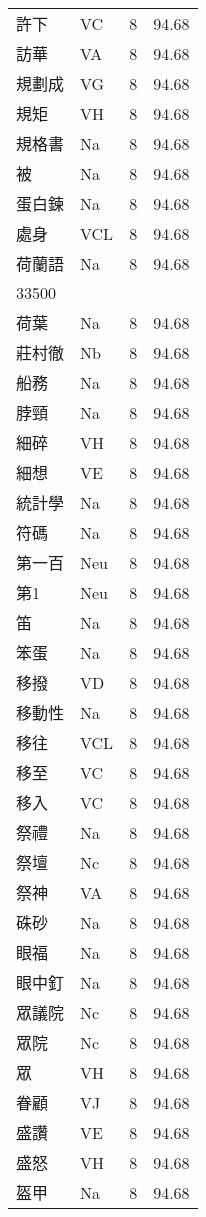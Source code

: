 \documentclass[twocolumn]{book}
\begin{document}
\begin{supertabular}{llrr}
許下 & VC & 8 &  94.68\\
訪華 & VA & 8 &  94.68\\
規劃成 & VG & 8 &  94.68\\
規矩 & VH & 8 &  94.68\\
規格書 & Na & 8 &  94.68\\
被 & Na & 8 &  94.68\\
蛋白鍊 & Na & 8 &  94.68\\
處身 & VCL & 8 &  94.68\\
荷蘭語 & Na & 8 &  94.68\\
33500\\
荷葉 & Na & 8 &  94.68\\
莊村徹 & Nb & 8 &  94.68\\
船務 & Na & 8 &  94.68\\
脖頸 & Na & 8 &  94.68\\
細碎 & VH & 8 &  94.68\\
細想 & VE & 8 &  94.68\\
統計學 & Na & 8 &  94.68\\
符碼 & Na & 8 &  94.68\\
第一百 & Neu & 8 &  94.68\\
第1 & Neu & 8 &  94.68\\
笛 & Na & 8 &  94.68\\
笨蛋 & Na & 8 &  94.68\\
移撥 & VD & 8 &  94.68\\
移動性 & Na & 8 &  94.68\\
移往 & VCL & 8 &  94.68\\
移至 & VC & 8 &  94.68\\
移入 & VC & 8 &  94.68\\
祭禮 & Na & 8 &  94.68\\
祭壇 & Nc & 8 &  94.68\\
祭神 & VA & 8 &  94.68\\
硃砂 & Na & 8 &  94.68\\
眼福 & Na & 8 &  94.68\\
眼中釘 & Na & 8 &  94.68\\
眾議院 & Nc & 8 &  94.68\\
眾院 & Nc & 8 &  94.68\\
眾 & VH & 8 &  94.68\\
眷顧 & VJ & 8 &  94.68\\
盛讚 & VE & 8 &  94.68\\
盛怒 & VH & 8 &  94.68\\
盔甲 & Na & 8 &  94.68\\

\end{supertabular}
\end{document}
